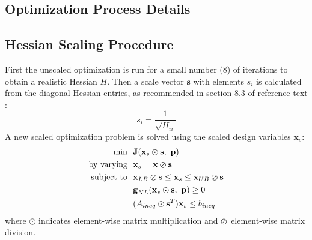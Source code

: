 \clearpage
\begin{appendices}
\section{Optimization Process Details}

\subsection{Hessian Scaling Procedure}\label{sec:appendix-scaling}
First the unscaled optimization is run for a small number (8) of iterations to obtain a realistic Hessian $H$.
Then a scale vector $\textbf{s}$ with elements $s_i$ is calculated from the diagonal Hessian entries, as recommended in section 8.3 of reference text \cite{papalambros_principles_2017}:
\begin{equation}
    s_i = \frac{1}{\sqrt{H_{ii}}}
\end{equation}
A new scaled optimization problem is solved using the scaled design variables $\textbf{x}_s$:
\begin{equation}
\begin{aligned}
    \text{min}~~& \textbf{J}(\textbf{x}_s \odot \textbf{s},~\textbf{p}) \\
    \text{by varying}~~&\textbf{x}_s= \textbf{x} \varoslash \textbf{s}\\
    \text{subject to}~~ &\textbf{x}_{LB}\varoslash \textbf{s} \leq \textbf{x}_s \leq \textbf{x}_{UB} \varoslash \textbf{s}\\
    &\textbf{g}_{NL}(\textbf{x}_s\odot\textbf{s},~\textbf{p}) \geq 0\\
    & (A_{ineq} \odot \textbf{s}^T)\textbf{x}_s \leq b_{ineq}
\label{standard}
\end{aligned}
\end{equation}
where $\odot$ indicates element-wise matrix multiplication and $\varoslash$ element-wise matrix division.


\end{appendices}
